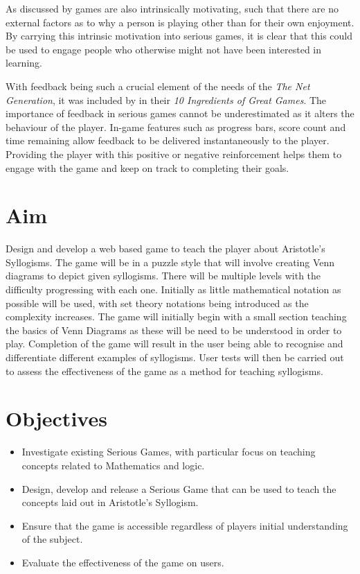 \documentclass[12pt,a4paper]{report}
\begin{document}
As discussed by \cite{malone1981toward} games are also intrinsically motivating, such that there are no external factors as to why a person is playing other than for their own enjoyment. By carrying this intrinsic motivation into serious games, it is clear that this could be used to engage people who otherwise might not have been interested in learning. 

With feedback being such a crucial element of the needs of the \textit{The Net Generation}, it was included by \cite{reeves2013total} in their \textit{10 Ingredients of Great Games}. The importance of feedback in serious games cannot be underestimated as it alters the behaviour of the player. In-game features such as progress bars, score count and time remaining allow feedback to be delivered instantaneously to the player. Providing the player with this positive or negative reinforcement helps them to engage with the game and keep on track to completing their goals. 

\section{Aim}
Design and develop a web based game to teach the player about Aristotle's Syllogisms. The game will be in a puzzle style that will involve creating Venn diagrams to depict given syllogisms. There will be multiple levels with the difficulty progressing with each one. Initially as little mathematical notation as possible will be used, with set theory notations being introduced as the complexity increases. The game will initially begin with a small section teaching the basics of Venn Diagrams as these will be need to be understood in order to play. Completion of the game will result in the user being able to recognise and differentiate different examples of syllogisms. User tests will then be carried out to assess the effectiveness of the game as a method for teaching syllogisms. 
\section{Objectives}
\begin{itemize}
  \item Investigate existing Serious Games, with particular focus on teaching concepts related to Mathematics and logic.

  \item Design, develop and release a Serious Game that can be used to teach the concepts laid out in Aristotle's Syllogism.
  \item Ensure that the game is accessible regardless of players initial understanding of the subject.
  \item Evaluate the effectiveness of the game on users.
  
\end{itemize}
\end{document}
